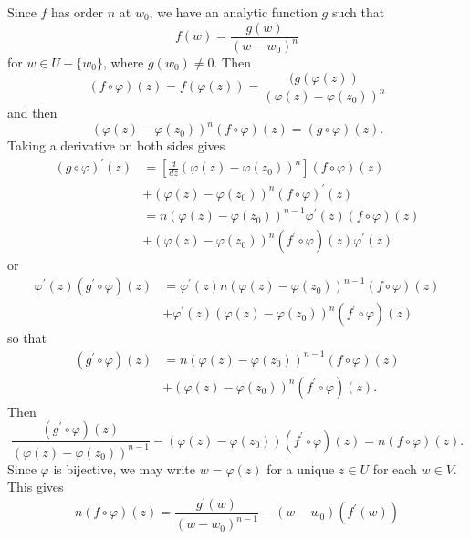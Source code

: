 \documentclass{article}
\begin{document}
Since $f$ has order $n$ at $w_0$, we have an analytic function
$g$ such that
$$
f(w) = \frac{g(w)}{(w - w_0)^n}
$$
for $w \in U - \{ w_0 \}$, where $g(w_0) \neq 0$.
Then
$$
  (f \circ \varphi)(z)
= f(\varphi(z))
= \frac{(g(\varphi(z))}
       {(\varphi(z) - \varphi(z_0))^n}
$$
and then
$$
  (\varphi(z) - \varphi(z_0))^n
  (f \circ \varphi)(z)
= (g \circ \varphi)(z).
$$
Taking a derivative on both sides gives
\begin{align*}
   (g \circ \varphi)^\prime(z)
&= \left[
     \frac{d}{dz}
     (\varphi(z) - \varphi(z_0))^n
   \right]
   (f \circ \varphi)(z) \\
&+ (\varphi(z) - \varphi(z_0))^n
   (f \circ \varphi)^\prime(z) \\
&= n(\varphi(z) - \varphi(z_0))^{n-1}
   \varphi^\prime(z)
   (f \circ \varphi)(z) \\
&+ (\varphi(z) - \varphi(z_0))^n
   (f^\prime \circ \varphi)(z)
   \varphi^\prime(z)
\end{align*}
or
\begin{align*}
   \varphi^\prime(z)(g^\prime \circ \varphi)(z)
&= \varphi^\prime(z)
   n(\varphi(z) - \varphi(z_0))^{n-1}
   (f \circ \varphi)(z) \\
&+ \varphi^\prime(z)
   (\varphi(z) - \varphi(z_0))^n
   (f^\prime \circ \varphi)(z)
\end{align*}
so that
\begin{align*}
   (g^\prime \circ \varphi)(z)
&= n(\varphi(z) - \varphi(z_0))^{n-1}
   (f \circ \varphi)(z) \\
&+ (\varphi(z) - \varphi(z_0))^n
   (f^\prime \circ \varphi)(z).
\end{align*}
Then
$$
  \frac{(g^\prime \circ \varphi)(z)}
       {(\varphi(z) - \varphi(z_0))^{n-1}}
- (\varphi(z) - \varphi(z_0))
  (f^\prime \circ \varphi)(z)
= n (f \circ \varphi)(z).
$$
Since $\varphi$ is bijective, we may
write $w = \varphi(z)$ for a unique $z \in U$ for each
$w \in V$. This gives
$$
  n (f \circ \varphi)(z)
= \frac{g^\prime(w)}
       {(w - w_0)^{n-1}}
- (w - w_0)(f^\prime(w))
$$
\end{document}
